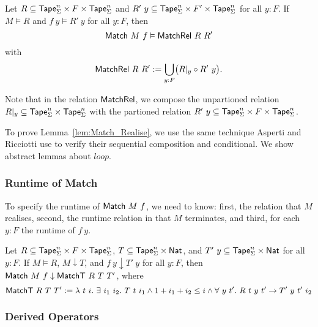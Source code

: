 \begin{lemma}
  \label{lem:Match_Realise}
  Let $R \subseteq \textsf{Tape}_\Sigma^n \times F \times \textsf{Tape}_\Sigma^n$ and $R'~y \subseteq \textsf{Tape}_\Sigma^n \times F' \times \textsf{Tape}_\Sigma^n$ for all $y:F$.
  If $M \vDash R$ and $f~y \vDash R'~y$ for all $y:F$, then
  \[
    \textsf{Match}~M~f \vDash \textsf{MatchRel}~R~R'
  \]
  with
  \[
    \textsf{MatchRel}~R~R' := \bigcup_{y:F} \bigl( R{|}_{y} \circ R'~y \bigr).
  \]
\end{lemma}

Note that in the relation $\textsf{MatchRel}$, we compose the unpartioned relation $R {|}_{y} \subseteq \textsf{Tape}_\Sigma^n \times \textsf{Tape}_\Sigma^n$ with the partioned
relation $R'~y \subseteq \textsf{Tape}_\Sigma^n \times F \times \textsf{Tape}_\Sigma^n$.

To prove Lemma~\ref{lem:Match_Realise}, we use the same technique Asperti and Ricciotti use to verify their sequential composition and conditional.
We show abstract lemmas about $loop$.




\subsubsection{Runtime of Match}
\label{sec:match-runtime}

To specify the runtime of $\textsf{Match}~M~f$, we need to know: first, the relation that $M$ realises, second, the runtime relation in that $M$
terminates, and third, for each $y:F$ the runtime of $f~y$.


\begin{lemma}
  Let $R \subseteq \textsf{Tape}_\Sigma^n \times F \times \textsf{Tape}_\Sigma^n$, $T \subseteq \textsf{Tape}_\Sigma^n \times \textsf{Nat}$, and
  $T'~y \subseteq \textsf{Tape}_\Sigma^n \times \textsf{Nat}$ for all $y:F$.  If $M \vDash R$, $M \downarrow T$, and $f~y \downarrow T'~y$ for all $y:F$, then
  $\textsf{Match}~M~f \downarrow \textsf{MatchT}~R~T~T'$, where
  \[
    \textsf{MatchT}~R~T~T' :=
    \lambda~t~i.~ \exists~i_1~i_2.~T~t~i_1 \land 1+i_1+i_2 \le i \land
      \forall~y~t'.~ R~t~y~t' \rightarrow T'~y~t'~i_2
  \]

\end{lemma}




\subsubsection{Derived Operators}
\label{sec:match-derived-operators}

